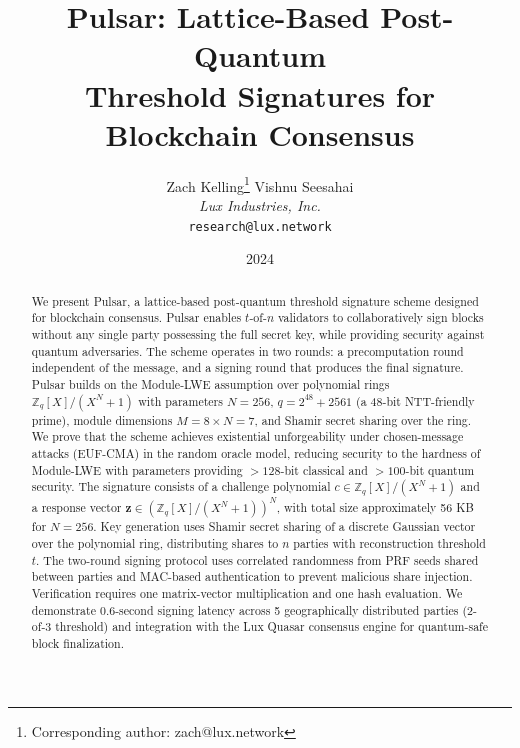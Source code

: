\documentclass[11pt,a4paper]{article}
\title{\textbf{Pulsar: Lattice-Based Post-Quantum\\Threshold Signatures for Blockchain Consensus}}
\author{
Zach Kelling\thanks{Corresponding author: zach@lux.network}
\quad
Vishnu Seesahai\\
\textit{Lux Industries, Inc.}\\
\texttt{research@lux.network}
}
\date{2024}
\begin{document}
\luxcoverpage

\begin{abstract}
We present Pulsar, a lattice-based post-quantum threshold signature scheme designed
for blockchain consensus. Pulsar enables $t$-of-$n$ validators to collaboratively
sign blocks without any single party possessing the full secret key, while providing
security against quantum adversaries. The scheme operates in two rounds: a precomputation
round independent of the message, and a signing round that produces the final signature.
Pulsar builds on the Module-LWE assumption over polynomial rings $\mathbb{Z}_q[X]/(X^N + 1)$
with parameters $N = 256$, $q = 2^{48} + 2561$ (a 48-bit NTT-friendly prime), module
dimensions $M = 8 \times N = 7$, and Shamir secret sharing over the ring.
We prove that the scheme achieves existential unforgeability under chosen-message
attacks (EUF-CMA) in the random oracle model, reducing security to the hardness of
Module-LWE with parameters providing $> 128$-bit classical and $> 100$-bit quantum
security. The signature consists of a challenge polynomial $c \in \mathbb{Z}_q[X]/(X^N+1)$
and a response vector $\mathbf{z} \in (\mathbb{Z}_q[X]/(X^N+1))^N$, with total size
approximately 56 KB for $N = 256$.
Key generation uses Shamir secret sharing of a discrete Gaussian vector over the
polynomial ring, distributing shares to $n$ parties with reconstruction threshold $t$.
The two-round signing protocol uses correlated randomness from PRF seeds shared
between parties and MAC-based authentication to prevent malicious share injection.
Verification requires one matrix-vector multiplication and one hash evaluation.
We demonstrate 0.6-second signing latency across 5 geographically distributed parties
(2-of-3 threshold) and integration with the Lux Quasar consensus engine for quantum-safe
block finalization.
\end{abstract}

\tableofcontents
\newpage










\end{document}
